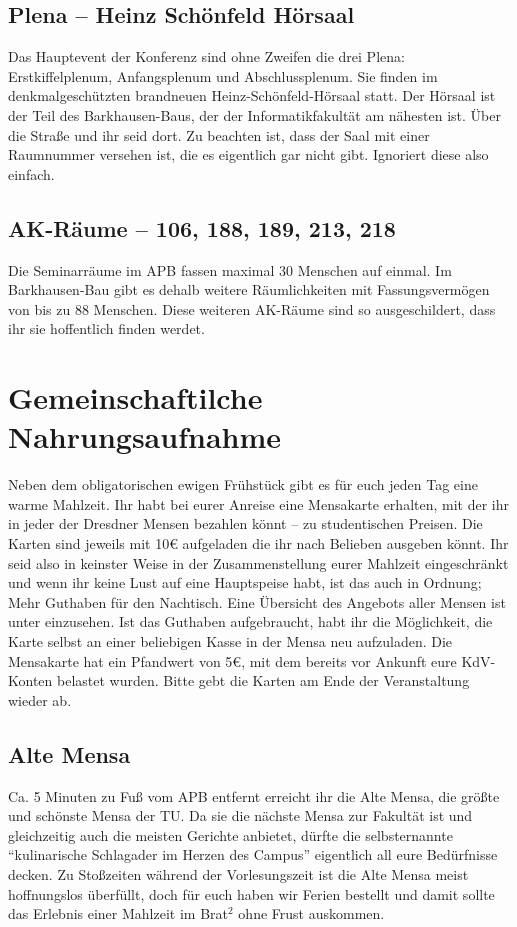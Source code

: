 \subsection*{Plena -- Heinz Schönfeld Hörsaal}
Das Hauptevent der Konferenz sind ohne Zweifen die drei Plena: Erstkiffelplenum, Anfangsplenum und Abschlussplenum.
Sie finden im denkmalgeschützten brandneuen Heinz-Schönfeld-Hörsaal statt.
Der Hörsaal ist der Teil des Barkhausen-Baus, der der Informatikfakultät am nähesten ist.
Über die Straße und ihr seid dort.
Zu beachten ist, dass der Saal mit einer Raumnummer versehen ist, die es eigentlich gar nicht gibt.
Ignoriert diese also einfach.

\subsection*{AK-Räume -- 106, 188, 189, 213, 218}
Die Seminarräume im APB fassen maximal 30 Menschen auf einmal.
Im Barkhausen-Bau gibt es dehalb weitere Räumlichkeiten mit Fassungsvermögen von bis zu 88 Menschen.
Diese weiteren AK-Räume sind so ausgeschildert, dass ihr sie hoffentlich finden werdet.

\section*{Gemeinschaftilche Nahrungsaufnahme}
Neben dem obligatorischen ewigen Frühstück gibt es für euch jeden Tag eine warme Mahlzeit.
Ihr habt bei eurer Anreise eine Mensakarte erhalten, mit der ihr in jeder der Dresdner Mensen bezahlen könnt -- zu studentischen Preisen.
Die Karten sind jeweils mit 10€ aufgeladen die ihr nach Belieben ausgeben könnt.
Ihr seid also in keinster Weise in der Zusammenstellung eurer Mahlzeit eingeschränkt und wenn ihr keine Lust auf eine Hauptspeise habt, ist das auch in Ordnung; Mehr Guthaben für den Nachtisch.
Eine Übersicht des Angebots aller Mensen ist unter  einzusehen.
Ist das Guthaben aufgebraucht, habt ihr die Möglichkeit, die Karte selbst an einer beliebigen Kasse in der Mensa neu aufzuladen.
Die Mensakarte hat ein Pfandwert von 5€, mit dem bereits vor Ankunft eure KdV-Konten belastet wurden.
Bitte gebt die Karten am Ende der Veranstaltung wieder ab.

\subsection*{Alte Mensa}
Ca. 5 Minuten zu Fuß vom APB entfernt erreicht ihr die Alte Mensa, die größte und schönste Mensa der TU\@.
Da sie die nächste Mensa zur Fakultät ist und gleichzeitig auch die meisten Gerichte anbietet, dürfte die selbsternannte \enquote{kulinarische Schlagader im Herzen des Campus} eigentlich all eure Bedürfnisse decken.
Zu Stoßzeiten während der Vorlesungszeit ist die Alte Mensa meist hoffnungslos überfüllt, doch für euch haben wir Ferien bestellt und damit sollte das Erlebnis einer Mahlzeit im Brat$^2$ ohne Frust auskommen.

